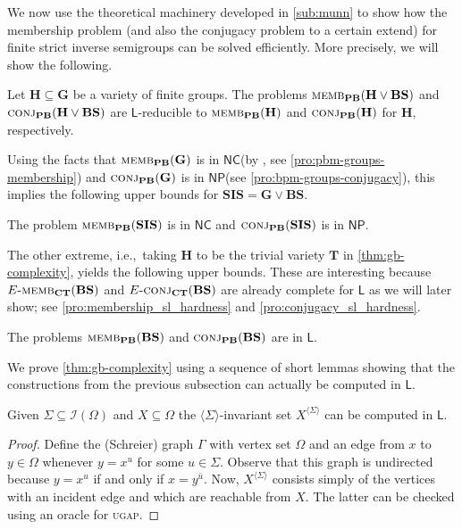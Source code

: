 \documentclass[anonymous,letter,UKenglish,cleveref,autoref,thm-restate]{lipics-v2021}
\newcommand{\ie}{i.e.,~}
\newcommand{\sse}{\subseteq}
\newcommand{\gen}[1]{\langle #1 \rangle}
\newcommand{\NC}{\ensuremath{\mathsf{NC}}\xspace}
\newcommand{\LOGSPACE}{\ensuremath{\mathsf{L}}\xspace}
\newcommand{\NP}{\ensuremath{\mathsf{NP}}\xspace}
\newcommand{\vT}{\ensuremath{\mathbf{T}}}
\newcommand{\vH}{\ensuremath{\mathbf{H}}}
\newcommand{\vG}{\ensuremath{\mathbf{G}}}
\newcommand{\vSI}{\ensuremath{\mathbf{SIS}}}
\newcommand{\vBS}{\ensuremath{\mathbf{BS}}}  \newcommand{\vBM}{\ensuremath{\mathbf{BM}}}
\newcommand{\ISym}{\cI}
\newcommand{\cI}{\mathcal{I}}
\theoremstyle{plain}
\theoremstyle{plain}
\newcommand{\dMemb}[2][]{\textup{\textsc{memb${}_{\mathbf{#1}}\expandafter\ifx\expandafter\relax\detokenize{#2}\relax\else(#2)\fi$}}}
\newcommand{\dConj}[2][]{\textup{\textsc{conj${}_{\mathbf{#1}}\expandafter\ifx\expandafter\relax\detokenize{#2}\relax\else(#2)\fi$}}}
\newcommand{\prob}[1]{\textup{\textsc{#1}}\xspace}
\newcommand{\dUGAP}{\prob{ugap}}
\newcommand{\dEMemb}[2][]{\ensuremath{E}\textnormal{-}\dMemb[#1]{#2}}
\newcommand{\dEConj}[2][]{\ensuremath{E}\textnormal{-}\dConj[#1]{#2}}
\begin{document}
We now use the theoretical machinery developed in \cref{sub:munn} to show how the membership problem (and also the conjugacy problem to a certain extend) for finite strict inverse semigroups can be solved efficiently.
More precisely, we will show the following.

\begin{theorem}\label{thm:gb-complexity}
Let $\vH \sse \vG$ be a variety of finite groups. The problems $\dMemb[PB]{\vH\vee \vBS}$ and $\dConj[PB]{\vH \vee \vBS}$ are \LOGSPACE-reducible to $\dMemb[PB]{\vH}$ and $\dConj[PB]{\vH}$ for $\vH$, respectively.
\end{theorem}

Using the facts that $\dMemb[PB]{\vG}$ is in \NC (by {\cite{BabaiLS87}}, see \cref{pro:pbm-groups-membership}) and $\dConj[PB]{\vG}$ is in \NP (see \cref{pro:bpm-groups-conjugacy}), this implies the following upper bounds for $\vSI = \vG \vee \vBS$.

\begin{corollary}\label{cor:gb-complexity}
The problem	$\dMemb[PB]{\vSI}$ is in \NC and $\dConj[PB]{\vSI}$ is in \NP.
\end{corollary}

The other extreme, \ie taking $\vH$ to be the trivial variety $\vT$ in \cref{thm:gb-complexity}, yields the following upper bounds.
These are interesting because $\dEMemb[CT]{\vBS}$ and $\dEConj[CT]{\vBS}$ are already complete for \LOGSPACE{} as we will later show; see \cref{pro:membership_sl_hardness} and \cref{pro:conjugacy_sl_hardness}.

\begin{corollary}\label{cor:mem-BS}
The problems $\dMemb[PB]{\vBS}$ and $\dConj[PB]{\vBS}$ are in \LOGSPACE.
\end{corollary}

We prove \cref{thm:gb-complexity} using a sequence of short lemmas showing that the constructions from the previous subsection can actually be computed in \LOGSPACE.

\begin{lemma}\label{lem:gb-delta-sl}
	Given $\Sigma \sse \ISym(\Omega)$ and $X \sse\Omega$ the $\gen{\Sigma}$-invariant set $X^{\gen{\Sigma}}$ can be computed in \LOGSPACE.
\end{lemma}
\begin{proof}
	Define the (Schreier) graph $\Gamma$ with vertex set $\Omega$ and an edge from $x$ to $y \in \Omega$ whenever $y = x^u$ for some $u \in \Sigma$.
  Observe that this graph is undirected because $y = x^u$ if and only if $x = y^{\bar u}$.
  Now, $X^{\gen{\Sigma}}$ consists simply of the vertices with an incident edge and which are reachable from $X$.
  The latter can be checked using an oracle for \dUGAP. 
\end{proof}
\end{document}
